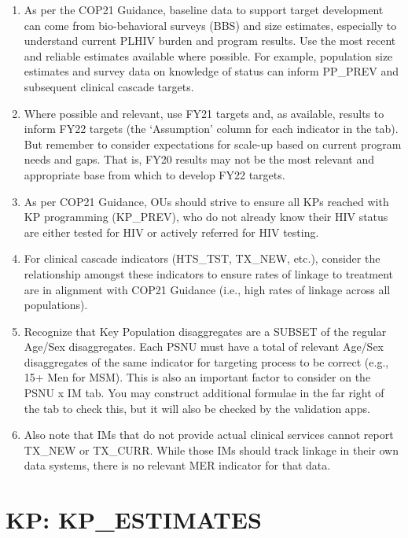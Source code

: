 \documentclass[
  openany]{book}
\begin{document}
\begin{enumerate}
\def\labelenumi{\arabic{enumi}.}
\item
  As per the COP21 Guidance, baseline data to support target
  development can come from bio-behavioral surveys (BBS) and size
  estimates, especially to understand current PLHIV burden and program
  results. Use the most recent and reliable estimates available where
  possible. For example, population size estimates and survey data on
  knowledge of status can inform PP\_PREV and subsequent clinical
  cascade targets.
\item
  Where possible and relevant, use FY21 targets and, as available,
  results to inform FY22 targets (the `Assumption' column for each
  indicator in the tab). But remember to consider expectations for
  scale-up based on current program needs and gaps. That is, FY20
  results may not be the most relevant and appropriate base from which
  to develop FY22 targets.
\item
  As per COP21 Guidance, OUs should strive to ensure all KPs reached
  with KP programming (KP\_PREV), who do not already know their HIV
  status are either tested for HIV or actively referred for HIV
  testing.
\item
  For clinical cascade indicators (HTS\_TST, TX\_NEW, etc.), consider
  the relationship amongst these indicators to ensure rates of linkage
  to treatment are in alignment with COP21 Guidance (i.e., high rates
  of linkage across all populations).
\item
  Recognize that Key Population disaggregates are a SUBSET of the
  regular Age/Sex disaggregates. Each PSNU must have a total of
  relevant Age/Sex disaggregates of the same indicator for targeting
  process to be correct (e.g., 15+ Men for MSM). This is also an
  important factor to consider on the PSNU x IM tab. You may construct
  additional formulae in the far right of the tab to check this, but
  it will also be checked by the validation apps.
\item
  Also note that IMs that do not provide actual clinical services
  cannot report TX\_NEW or TX\_CURR. While those IMs should track
  linkage in their own data systems, there is no relevant MER
  indicator for that data.
\end{enumerate}

\hypertarget{kp-kp_estimates}{%
\section{KP: KP\_ESTIMATES}\label{kp-kp_estimates}}
\end{document}
